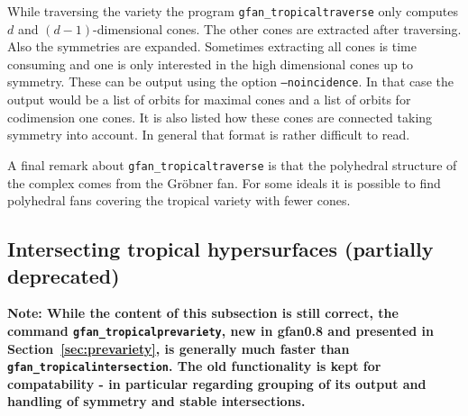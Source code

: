 
While traversing the variety the program
\texttt{gfan\_tropicaltraverse} only computes $d$ and
$(d-1)$-dimensional cones. The other cones are extracted after
traversing. Also the symmetries are expanded. Sometimes extracting all
cones is time consuming and one is only interested in the high
dimensional cones up to symmetry. These can be output using the option
\texttt{--noincidence}. In that case the output would be a list of
orbits for maximal cones and a list of orbits for codimension one
cones. It is also listed how these cones are connected taking symmetry
into account. In general that format is rather difficult to read.


A final remark about \texttt{gfan\_tropicaltraverse} is that the
polyhedral structure of the complex comes from the Gr\"obner fan. For
some ideals it is possible to find polyhedral fans covering the
tropical variety with fewer cones.


\subsection{Intersecting tropical hypersurfaces (partially deprecated)}
{\bf Note: While the content of this subsection is still correct, the command \texttt{gfan\_tropicalprevariety}, new in gfan0.8 and presented in Section~\ref{sec:prevariety}, is generally much faster than \texttt{gfan\_tropicalintersection}. The old functionality is kept for compatability - in particular regarding grouping of its output and handling of symmetry and stable intersections.}

